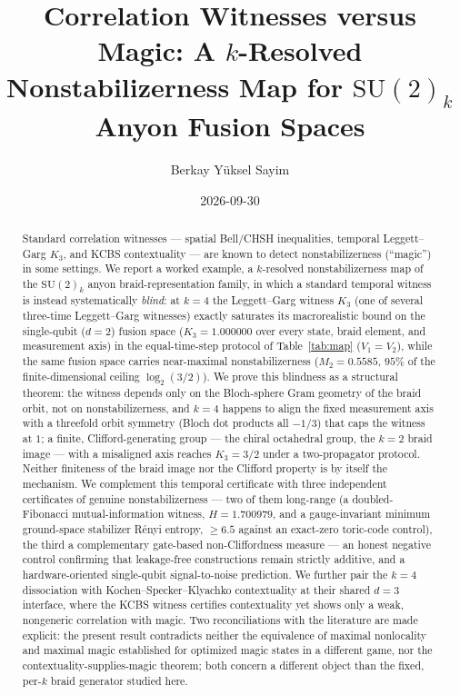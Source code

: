 \documentclass[aps,pra,twocolumn,superscriptaddress,longbibliography,floatfix,nofootinbib]{revtex4-2}
\begin{document}
\setcounter{secnumdepth}{3}

\title{Correlation Witnesses versus Magic: A $k$-Resolved Nonstabilizerness Map for $\mathrm{SU}(2)_k$ Anyon Fusion Spaces}

\author{Berkay Y\"uksel Sayim}

\date{2026-09-30}

\begin{abstract}
Standard correlation witnesses --- spatial Bell/CHSH inequalities,
temporal Leggett--Garg $K_3$, and KCBS contextuality --- are known to
detect nonstabilizerness (``magic'') in some settings. We report a
worked example, a $k$-resolved nonstabilizerness map of the
$\mathrm{SU}(2)_k$ anyon braid-representation family, in which a
standard temporal witness is instead systematically \emph{blind}: at
$k=4$ the Leggett--Garg witness $K_3$ (one of several three-time
Leggett--Garg witnesses) exactly saturates its macrorealistic bound on
the single-qubit ($d=2$) fusion space ($K_3=1.000000$ over every state,
braid element, and measurement axis) in the equal-time-step protocol of
Table~\ref{tab:map} ($V_1{=}V_2$), while the same fusion space carries
near-maximal nonstabilizerness ($M_2=0.5585$, $95\%$ of the
finite-dimensional ceiling $\log_2(3/2)$). We prove this blindness as
a structural theorem: the witness depends only on the Bloch-sphere
Gram geometry of the braid orbit, not on nonstabilizerness, and $k=4$
happens to align the fixed measurement axis with a threefold orbit
symmetry (Bloch dot products all $-1/3$) that caps the witness at
$1$; a finite, Clifford-generating group --- the chiral octahedral
group, the $k{=}2$ braid image --- with a misaligned axis reaches
$K_3=3/2$ under a two-propagator protocol. Neither finiteness of the braid image nor the
Clifford property is by itself the mechanism. We complement this
temporal certificate with three independent certificates of genuine
nonstabilizerness --- two of them long-range (a doubled-Fibonacci
mutual-information witness, $H=1.700979$, and a gauge-invariant minimum
ground-space stabilizer Rényi entropy, $\geq6.5$ against an exact-zero
toric-code control), the third a complementary gate-based
non-Cliffordness measure --- an honest negative
control confirming that leakage-free constructions remain strictly
additive, and a hardware-oriented single-qubit signal-to-noise
prediction. We further pair the $k=4$ dissociation with Kochen--Specker--Klyachko
contextuality at their shared $d=3$ interface, where the KCBS witness certifies
contextuality yet shows only a weak, nongeneric correlation with magic. Two reconciliations with the literature are made explicit: the present result contradicts
neither the equivalence of maximal nonlocality and maximal magic established for optimized magic
states in a different game, nor the contextuality-supplies-magic theorem; both concern a
different object than the fixed, per-$k$ braid generator studied here.
\end{abstract}
\end{document}
